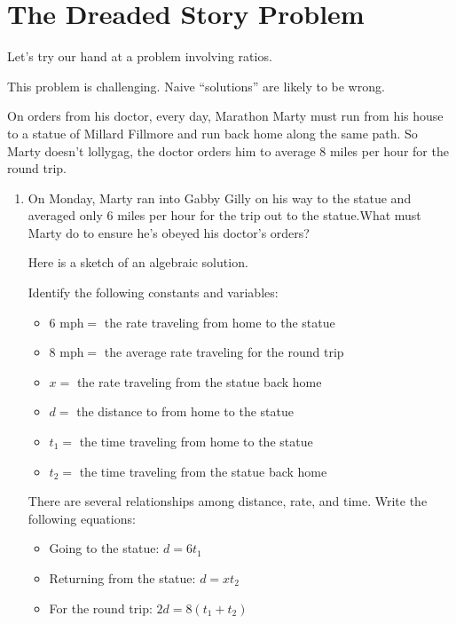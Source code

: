 \newpage
\section{The Dreaded Story Problem}\label{A:dreadedStoryProblem}

Let's try our hand at a problem involving ratios.

\begin{teachingnote}
This problem is challenging.  Naive ``solutions'' are likely to be wrong.  
\end{teachingnote}


\begin{prob}
On orders from his doctor, every day, Marathon Marty must run from his
house to a statue of Millard Fillmore and run back home along the same
path.  So Marty doesn't lollygag, the doctor orders him to average 8
miles per hour for the round trip.  
\begin{enumerate}
\item On Monday, Marty ran into Gabby Gilly on his way
to the statue and averaged only 6 miles per hour for the trip out to
the statue.What must Marty do to ensure he's obeyed his doctor's orders? 


\begin{teachingnote}
Here is a sketch of an algebraic solution.  

Identify the following constants and variables:  
\begin{itemize}
\item $6 \text{ mph} =$ the rate traveling from home to the statue
\item $8 \text{ mph} =$ the average rate traveling for the round trip
\item $x = $ the rate traveling from the statue back home
\item $d =$ the distance to from home to the statue
\item $t_1 = $ the time traveling from home to the statue
\item $t_2 = $ the time traveling from the statue back home
\end{itemize}

\vspace{0.15in}

There are several relationships among distance, rate, and time.  Write the following equations: 
\begin{itemize}
\item Going to the statue:  $d = 6t_1$
\item Returning from the statue:  $d = xt_2$
\item For the round trip:  $2d = 8(t_1+t_2)$
\end{itemize}


\end{teachingnote}
\end{enumerate}
\end{prob}
